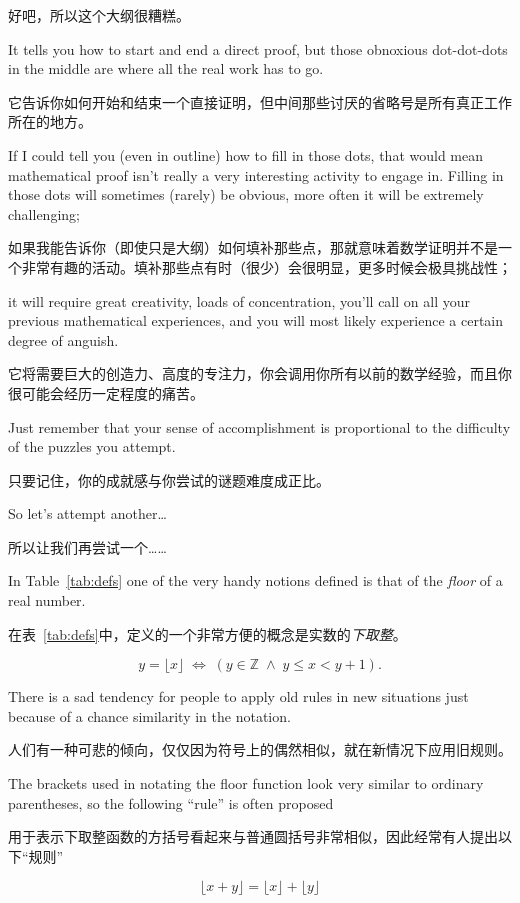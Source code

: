 好吧，所以这个大纲很糟糕。

It tells you how to start and
end a direct proof, but those obnoxious dot-dot-dots in the middle are
where all the real work has to go.

它告诉你如何开始和结束一个直接证明，但中间那些讨厌的省略号是所有真正工作所在的地方。

If I could tell you (even in outline)
how to fill in those dots, that would mean mathematical proof isn't really
a very interesting activity to engage in.  Filling in those dots will
sometimes (rarely) be obvious, more often it will be extremely challenging;

如果我能告诉你（即使只是大纲）如何填补那些点，那就意味着数学证明并不是一个非常有趣的活动。填补那些点有时（很少）会很明显，更多时候会极具挑战性；

it will require great creativity, loads of concentration, you'll call on
all your previous mathematical experiences, and you will most likely
experience a certain degree of anguish.

它将需要巨大的创造力、高度的专注力，你会调用你所有以前的数学经验，而且你很可能会经历一定程度的痛苦。

Just remember that your sense
of accomplishment is proportional to the difficulty of the puzzles you
attempt.

只要记住，你的成就感与你尝试的谜题难度成正比。

So let's attempt another\ldots

所以让我们再尝试一个……

In Table~\ref{tab:defs} one of the very handy notions defined is that
of the \emph{floor} of a real number.

在表~\ref{tab:defs}中，定义的一个非常方便的概念是实数的\emph{下取整}。

\[ y = \lfloor x \rfloor \; \iff \; (y \in \mathbb Z \; \land \; y \leq x < y+1).\]

There is a sad tendency for people to apply old rules in new situations
just because of a chance similarity in the notation.

人们有一种可悲的倾向，仅仅因为符号上的偶然相似，就在新情况下应用旧规则。

The brackets used
in notating the floor function look very similar to ordinary parentheses,
so the following ``rule'' is often proposed

用于表示下取整函数的方括号看起来与普通圆括号非常相似，因此经常有人提出以下“规则”

\[ \lfloor x + y \rfloor = \lfloor x \rfloor + \lfloor y \rfloor \]

